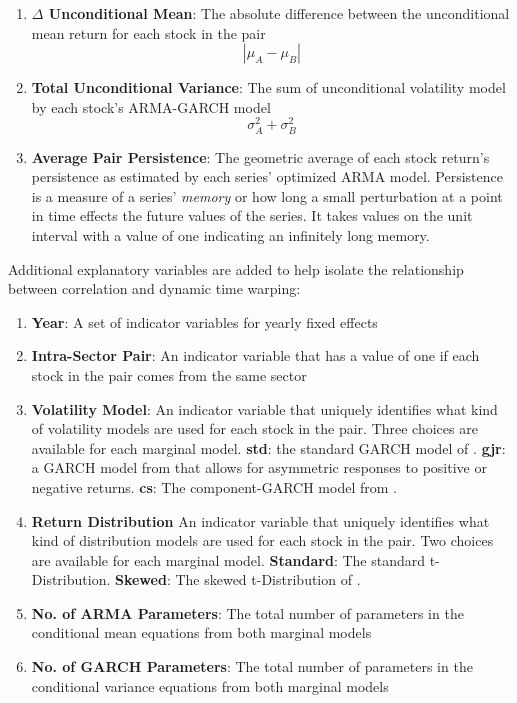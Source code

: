\documentclass[12pt]{report}
\begin{document}
\begin{enumerate}
    \item \textbf{$\Delta$ Unconditional Mean}: The absolute difference between the unconditional mean return for each stock in the pair
    \begin{equation}
        |\mu_{A} - \mu_{B}|
    \end{equation}
    \item \textbf{Total Unconditional Variance}: The sum of unconditional volatility model by each stock's ARMA-GARCH model
    \begin{equation}
        \sigma^{2}_{A} + \sigma^{2}_{B}
    \end{equation} 
    \item \textbf{Average Pair Persistence}: The geometric average of each stock return's persistence as estimated by each series' optimized ARMA model. Persistence is a measure of a series' \textit{memory} or how long a small perturbation at a point in time effects the future values of the series. It takes values on the unit interval with a value of one indicating an infinitely long memory.
\end{enumerate}

Additional explanatory variables are added to help isolate the relationship between correlation and dynamic time warping:

\begin{enumerate}
    \item \textbf{Year}: A set of indicator variables for yearly fixed effects
    \item \textbf{Intra-Sector Pair}: An indicator variable that has a value of one if each stock in the pair comes from the same sector
    \item \textbf{Volatility Model}: An indicator variable that uniquely identifies what kind of volatility models are used for each stock in the pair. Three choices are available for each marginal model. \textbf{std}: the standard GARCH model of \cite{Bollerslev1986Garch}. \textbf{gjr}: a GARCH model from \cite{GJR1993Garch} that allows for asymmetric responses to positive or negative returns. \textbf{cs}: The component-GARCH model from \cite{EngleLee1993APA}.
    \item \textbf{Return Distribution} An indicator variable that uniquely identifies what kind of distribution models are used for each stock in the pair. Two choices are available for each marginal model. \textbf{Standard}: The standard t-Distribution. \textbf{Skewed}: The skewed t-Distribution of \cite{FernandezSteel1998}.
    \item \textbf{No. of ARMA Parameters}: The total number of parameters in the conditional mean equations from both marginal models
    \item \textbf{No. of GARCH Parameters}: The total number of parameters in the conditional variance equations from both marginal models
\end{enumerate}
\end{document}
